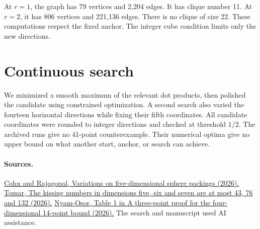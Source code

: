 \documentclass[10pt]{article}
\begin{document}
At \(r=1\), the graph has 79 vertices and 2,204 edges. It has clique
number 11. At \(r=2\), it has 806 vertices and 221,136 edges. There is no
clique of size 22. These computations respect the fixed anchor. The
integer cube condition limits only the new directions.

\section{Continuous search}
We minimized a smooth maximum of the relevant dot products, then
polished the candidate using constrained optimization. A second
search also varied the fourteen horizontal directions while fixing
their fifth coordinates. All candidate coordinates were rounded to
integer directions and checked at threshold \(1/2\). The archived runs
give no 41-point counterexample. Their numerical optima give no upper
bound on what another start, anchor, or search can achieve.

\paragraph{Sources.}
\href{https://doi.org/10.1007/s00454-026-00841-x}{Cohn and Rajagopal,
Variations on five-dimensional sphere packings (2026).}
\href{https://www.mefyi.com/papers/kissing-numbers-five-seven/}{Tomar,
The kissing numbers in dimensions five, six and seven are at most 43,
76 and 132 (2026).}
\href{https://zenodo.org/records/24014108}{Nyam-Osor, Table 1 in
A three-point proof for the four-dimensional 14-point bound (2026).}
The search and manuscript used AI assistance.
\end{document}
